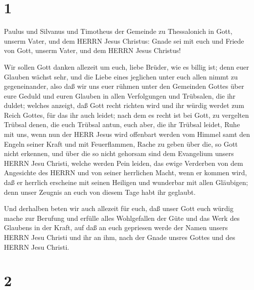 \hypertarget{section}{%
\section{1}\label{section}}

 Paulus und Silvanus und Timotheus der Gemeinde zu
Thessalonich in Gott, unserm Vater, und dem HERRN Jesus Christus:
 Gnade sei mit euch und Friede von Gott, unserm Vater, und
dem HERRN Jesus Christus!

 Wir sollen Gott danken allezeit um euch, liebe Brüder, wie
es billig ist; denn euer Glauben wächst sehr, und die Liebe eines
jeglichen unter euch allen nimmt zu gegeneinander,  also daß
wir uns euer rühmen unter den Gemeinden Gottes über eure Geduld und
euren Glauben in allen Verfolgungen und Trübsalen, die ihr duldet;
 welches anzeigt, daß Gott recht richten wird und ihr würdig
werdet zum Reich Gottes, für das ihr auch leidet;  nach dem
es recht ist bei Gott, zu vergelten Trübsal denen, die euch Trübsal
antun,  euch aber, die ihr Trübsal leidet, Ruhe mit uns,
wenn nun der HERR Jesus wird offenbart werden vom Himmel samt den Engeln
seiner Kraft  und mit Feuerflammen, Rache zu geben über die,
so Gott nicht erkennen, und über die so nicht gehorsam sind dem
Evangelium unsers HERRN Jesu Christi,  welche werden Pein
leiden, das ewige Verderben von dem Angesichte des HERRN und von seiner
herrlichen Macht,  wenn er kommen wird, daß er herrlich
erscheine mit seinen Heiligen und wunderbar mit allen Gläubigen; denn
unser Zeugnis an euch von diesem Tage habt ihr geglaubt.

 Und derhalben beten wir auch allezeit für euch, daß unser
Gott euch würdig mache zur Berufung und erfülle alles Wohlgefallen der
Güte und das Werk des Glaubens in der Kraft,  auf daß an
euch gepriesen werde der Namen unsers HERRN Jesu Christi und ihr an ihm,
nach der Gnade unsres Gottes und des HERRN Jesu Christi.

\hypertarget{section-1}{%
\section{2}\label{section-1}}

